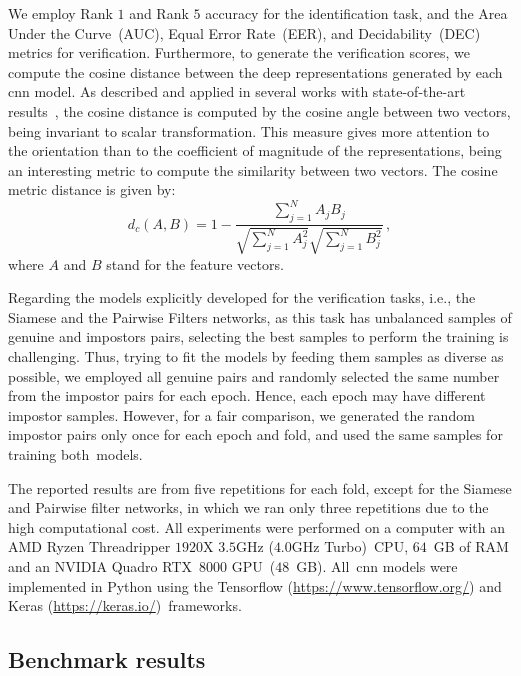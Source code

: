 We employ Rank $1$ and Rank $5$ accuracy for the identification task, and the Area Under the Curve~(AUC), Equal Error Rate~(EER), and Decidability~(DEC) metrics for verification.
Furthermore, to generate the verification scores, we compute the cosine distance between the deep representations generated by each \gls*{cnn} model.
As described and applied in several works with state-of-the-art results~\cite{Luz2018, zanlorensi2018impact, zanlorensi2020deep, zanlorensi2020attnormalization}, the cosine distance is computed by the cosine angle between two vectors, being invariant to scalar transformation.
This measure gives more attention to the orientation than to the coefficient of magnitude of the representations, being an interesting metric to compute the similarity between two vectors.
The cosine metric distance is given by:
\begin{equation}
d_{c}(A,B) = 1 - \frac{\sum_{j=1}^{N}A_{j}B_{j}}{\sqrt{\sum_{j=1}^{N}A_{j}^2} \sqrt{\sum_{j=1}^{N}B_{j}^2}} \,,
\end{equation}
\noindent where $A$ and $B$ stand for the feature vectors.

Regarding the models explicitly developed for the verification tasks, i.e., the Siamese and the Pairwise Filters networks, as this task has unbalanced samples of genuine and impostors pairs, selecting the best samples to perform the training is challenging.
Thus, trying to fit the models by feeding them samples as diverse as possible, we employed all genuine pairs and randomly selected the same number from the impostor pairs for each epoch.
Hence, each epoch may have different impostor samples.
However, for a fair comparison, we generated the random impostor pairs only once for each epoch and fold, and used the same samples for training both~models.

The reported results are from five repetitions for each fold, except for the Siamese and Pairwise filter networks, in which we ran only three repetitions due to the high computational cost.
All experiments were performed on a computer with an AMD Ryzen Threadripper $1920$X $3.5$GHz ($4.0$GHz Turbo)~CPU, $64$~GB of RAM and an NVIDIA Quadro RTX~$8000$ GPU~($48$~GB).
All~\gls*{cnn} models were implemented in Python using the Tensorflow ({\small\url{https://www.tensorflow.org/}}) and Keras ({\small\url{https://keras.io/}})~frameworks.

\subsection{Benchmark results}

